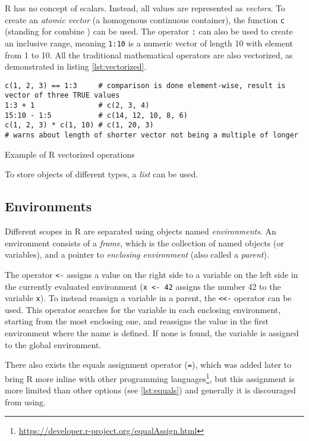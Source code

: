 R has no concept of scalars. Instead, all values are represented as \textit{vectors}. To create an \textit{atomic vector} (a homogenous continuous container), the function \texttt{c} (standing for combine ) can be used. The operator \texttt{:} can also be used to create an inclusive range, meaning \texttt{1:10} is a numeric vector of length 10 with element from 1 to 10. All the traditional mathematical operators are also vectorized, as demonstrated in listing \ref{lst:vectorized}.

\begin{listing}[h!]
	\centering
	\begin{verbatim}
c(1, 2, 3) == 1:3     # comparison is done element-wise, result is vector of three TRUE values
1:3 + 1               # c(2, 3, 4)
15:10 - 1:5           # c(14, 12, 10, 8, 6)
c(1, 2, 3) * c(1, 10) # c(1, 20, 3)
# warns about length of shorter vector not being a multiple of longer
    \end{verbatim}
	\caption{Example of R vectorized operations}\label{lst:vectorized}
\end{listing}

To store objects of different types, a \textit{list} can be used.

\subsection{Environments}

Different scopes in R are separated using objects named \textit{environments}. An environment consists of a \textit{frame}, which is the collection of named objects (or variables), and a pointer to \textit{enclosing environment} (also called a \textit{parent}).

The operator \texttt{<-} assigns a value on the right side to a variable on the left side in the currently evaluated environment (\texttt{x <- 42} assigns the number 42 to the variable \texttt{x}). To instead reassign a variable in a parent, the \texttt{<<-} operator can be used. This operator searches for the variable in each enclosing environment, starting from the most enclosing one, and reassigns the value in the first environment where the name is defined. If none is found, the variable is assigned to the global environment.

There also exists the equals assignment operator (\texttt{=}), which was added later to bring R more inline with other programming languages\footnote{\url{https://developer.r-project.org/equalAssign.html}}, but this assignment is more limited than other options (see \ref{lst:equals}) and generally it is discouraged from using.

